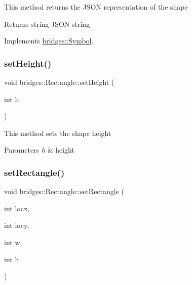 This method returns the J\+S\+ON representation of the shape

\begin{DoxyReturn}{Returns}
string J\+S\+ON string 
\end{DoxyReturn}


Implements \mbox{\hyperlink{classbridges_1_1_symbol_ab4dd31fbc736b2e58e8b8bb8446eac73}{bridges\+::\+Symbol}}.

\mbox{\label{classbridges_1_1_rectangle_aa14d6619e60de1d660fa6f3770dfaaa7}} 
\subsubsection{\texorpdfstring{setHeight()}{setHeight()}}
{\footnotesize\ttfamily void bridges\+::\+Rectangle\+::set\+Height (\begin{DoxyParamCaption}\item[{int}]{h }\end{DoxyParamCaption})\hspace{0.3cm}{\ttfamily [inline]}}

This method sets the shape height


\begin{DoxyParams}{Parameters}
{\em h} & height \\
\hline
\end{DoxyParams}
\mbox{\label{classbridges_1_1_rectangle_aee11bd9b9601d54c652b5b225c75bbac}} 
\subsubsection{\texorpdfstring{setRectangle()}{setRectangle()}}
{\footnotesize\ttfamily void bridges\+::\+Rectangle\+::set\+Rectangle (\begin{DoxyParamCaption}\item[{int}]{locx,  }\item[{int}]{locy,  }\item[{int}]{w,  }\item[{int}]{h }\end{DoxyParamCaption})\hspace{0.3cm}{\ttfamily [inline]}}

